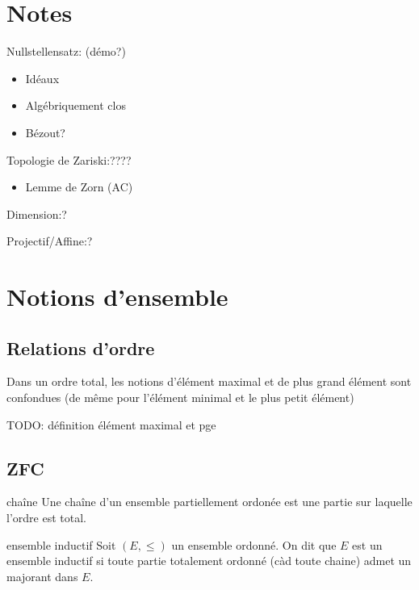 \section{Notes}

Nullstellensatz: (démo?)
\begin{itemize}
    \item Idéaux
    \item Algébriquement clos
    \item Bézout?
\end{itemize}
\mbox{}

Topologie de Zariski:????
\begin{itemize}
    \item Lemme de Zorn (AC)
\end{itemize}
\mbox{}

Dimension:?
\mbox{}

Projectif/Affine:?
\mbox{}

\newpage




\section{Notions d'ensemble}

\subsection{Relations d'ordre}

\begin{remark}{}{}
    Dans un ordre total, les notions d'élément maximal et de plus grand élément sont confondues (de même pour l'élément minimal et le plus petit élément)
\end{remark}

TODO: définition élément maximal et pge


\subsection{ZFC}

\begin{definition}{chaîne}{}
    Une chaîne d'un ensemble partiellement ordonée est une partie sur laquelle l'ordre est total.
\end{definition}

\begin{definition}{ensemble inductif}{}
    Soit $(E, \leqslant)$ un ensemble ordonné. On dit que $E$ est un ensemble inductif si toute partie
    totalement ordonné (càd toute chaine) admet un majorant dans $E$.
\end{definition}

